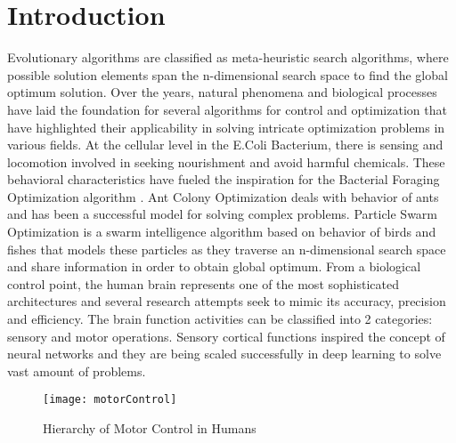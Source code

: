 \section{Introduction}

Evolutionary algorithms are classified as meta-heuristic search algorithms, where possible solution elements span the n-dimensional search space to find the global optimum solution. Over the years, natural phenomena and biological processes have laid the foundation for several algorithms for control and optimization that have highlighted their applicability in solving intricate optimization problems in various fields. At the cellular level in the E.Coli Bacterium, there is sensing and locomotion involved in seeking nourishment and avoid harmful chemicals. These behavioral characteristics have fueled the inspiration for the Bacterial Foraging Optimization algorithm \cite{passino2002biomimicry}\cite{onwubolu2013new}. Ant Colony Optimization \cite{dorigo2010ant} deals with behavior of ants and has been a successful model for solving complex problems. Particle Swarm Optimization \cite{kennedy2011particle} is a swarm intelligence algorithm based on behavior of birds and fishes that models these particles as they traverse an n-dimensional search space and share information in order to obtain global optimum.
From a biological control point, the human brain represents one of the most sophisticated architectures and several research attempts seek to mimic its accuracy, precision and efficiency. The brain function activities can be classified into 2 categories: sensory and motor operations. Sensory cortical functions inspired the concept of neural networks and they are being scaled successfully in deep learning to solve vast amount of problems.

\begin{figure}[h!]
  \texttt{[image: motorControl]}
  \caption{Hierarchy of Motor Control in Humans}
  \label{fig:motorControl}
\end{figure}

